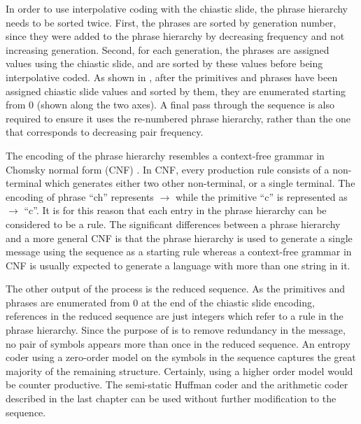 In order to use interpolative coding with the chiastic slide, the
phrase hierarchy needs to be sorted twice.  First, the phrases
are sorted by generation number, since they were added to the phrase
hierarchy by decreasing frequency and not increasing generation.
Second, for each generation, the phrases are assigned values 
using the chiastic slide, 
and are sorted by these values before being interpolative coded.
As shown in , after the primitives and 
phrases have been assigned chiastic slide values and sorted
by them, they are enumerated starting from 0 (shown along the two
axes).  A final pass through the sequence is also required
to ensure it uses the re-numbered phrase hierarchy, rather 
than the one that corresponds to decreasing pair frequency.

The encoding of the phrase hierarchy 
resembles a context-free grammar in Chomsky normal form (CNF) 
\citep{chomsky59:ic}.  In CNF, every production rule consists of a 
non-terminal which generates either two other non-terminal, or a 
single terminal.  The encoding of phrase ``ch'' represents
 $\rightarrow$  while the primitive ``c''
is represented as  $\rightarrow$ ``c''.  It is
for this reason that each entry in the phrase hierarchy can
be considered to be a rule.  The significant differences 
between a \repair phrase hierarchy and a more general CNF is 
that the phrase hierarchy is used to generate a single message
using the sequence as a starting rule whereas a context-free 
grammar in CNF is  usually expected to generate 
a language with more than one string in it.


The other output of the \repair process is the reduced sequence.  
As the primitives and phrases are enumerated from 0 at the end
of the chiastic slide encoding, references in the reduced
sequence are just integers which refer to a rule in the phrase hierarchy.
Since the purpose of \repair is to remove redundancy 
in the message, no pair of symbols appears more than once in
the reduced sequence.  An entropy coder using a zero-order model on the
symbols in the sequence captures the great majority of 
the remaining structure.  Certainly, using a higher 
order model would be counter productive.
The semi-static Huffman coder and the arithmetic coder described
in the last chapter 
can be used without further modification to the sequence.



